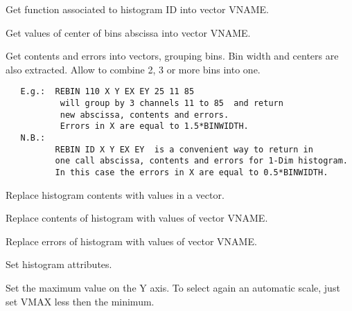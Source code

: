 \BEGARG
{}
\ENDARG
\BEGTEXT
Get function associated to histogram ID into vector VNAME.
\ENDTEXT

\BEGARG
{}
\ENDARG
\BEGTEXT
Get values of center of bins abscissa into vector VNAME.
\ENDTEXT

\BEGARG
{}
\ENDARG
\BEGTEXT
Get contents and errors into vectors, grouping bins.
Bin width and centers are also extracted.
Allow to combine 2, 3 or more bins into one.
\begin{verbatim}
   E.g.:  REBIN 110 X Y EX EY 25 11 85
           will group by 3 channels 11 to 85  and return
           new abscissa, contents and errors.
           Errors in X are equal to 1.5*BINWIDTH.
   N.B.:
          REBIN ID X Y EX EY  is a convenient way to return in
          one call abscissa, contents and errors for 1-Dim histogram.
          In this case the errors in X are equal to 0.5*BINWIDTH.
\end{verbatim}
\ENDTEXT


\BEGTEXT
Replace histogram contents with values in a vector.
\ENDTEXT

\BEGARG
{}
\ENDARG
\BEGTEXT
Replace contents of histogram with values of vector VNAME.
\ENDTEXT

\BEGARG
{}
\ENDARG
\BEGTEXT
Replace errors of histogram with values of vector VNAME.
\ENDTEXT


\BEGTEXT
Set histogram attributes.
\ENDTEXT

\BEGARG
{}
\ENDARG
\BEGTEXT
Set the maximum value on the Y axis.
To select again an automatic scale, just set VMAX less then
the minimum.
\ENDTEXT

